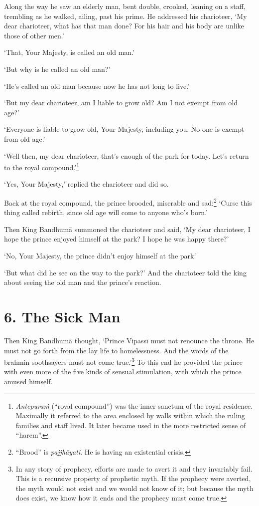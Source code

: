 \documentclass[12pt,openany]{book}%
\begin{document}
Along the way he saw an elderly man, bent double, crooked, leaning on a staff, trembling as he walked, ailing, past his prime. He addressed his charioteer, ‘My dear charioteer, what has that man done? For his hair and his body are unlike those of other men.’ 

‘That, Your Majesty, is called an old man.’ 

‘But why is he called an old man?’ 

‘He’s called an old man because now he has not long to live.’ 

‘But my dear charioteer, am I liable to grow old? Am I not exempt from old age?’ 

‘Everyone is liable to grow old, Your Majesty, including you. No-one is exempt from old age.’ 

‘Well then, my dear charioteer, that’s enough of the park for today. Let’s return to the royal compound.’\footnote{\textit{\textsanskrit{Antepuraṁ}} (“royal compound”) was the inner sanctum of the royal residence. Maximally it referred to the area enclosed by walls within which the ruling families and staff lived. It later became used in the more restricted sense of “harem”. } 

‘Yes, Your Majesty,’ replied the charioteer and did so. 

Back at the royal compound, the prince brooded, miserable and sad:\footnote{“Brood” is \textit{\textsanskrit{pajjhāyati}}. He is having an existential crisis. } ‘Curse this thing called rebirth, since old age will come to anyone who’s born.’ 

Then King \textsanskrit{Bandhumā} summoned the charioteer and said, ‘My dear charioteer, I hope the prince enjoyed himself at the park? I hope he was happy there?’ 

‘No, Your Majesty, the prince didn’t enjoy himself at the park.’ 

‘But what did he see on the way to the park?’ And the charioteer told the king about seeing the old man and the prince’s reaction. 

\section*{6. The Sick Man }

Then King \textsanskrit{Bandhumā} thought, ‘Prince \textsanskrit{Vipassī} must not renounce the throne. He must not go forth from the lay life to homelessness. And the words of the brahmin soothsayers must not come true.’\footnote{In any story of prophecy, efforts are made to avert it and they invariably fail. This is a recursive property of prophetic myth. If the prophecy were averted, the myth would not exist and we would not know of it; but because the myth does exist, we know how it ends and the prophecy must come true. } To this end he provided the prince with even more of the five kinds of sensual stimulation, with which the prince amused himself. 
\end{document}
